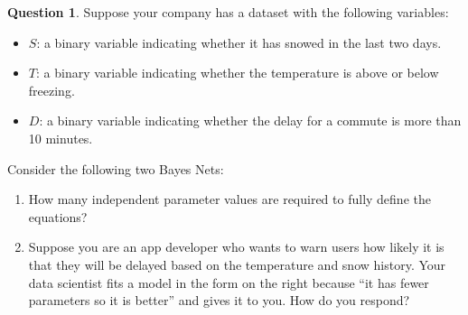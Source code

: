\documentclass{article}
\theoremstyle{definition}
\newtheorem{question}[thm]{Question}
\begin{document}
\begin{question}
Suppose your company has a dataset with the following variables:
\begin{itemize}[noitemsep]
    \item $S$: a binary variable indicating whether it has snowed in the last two days.
    \item $T$: a binary variable indicating whether the temperature is above or below freezing.
    \item $D$: a binary variable indicating whether the delay for a commute is more than 10 minutes.
\end{itemize}

Consider the following two Bayes Nets:

\begin{multicols}{2}
    \begin{center}

    \end{center}  
\end{multicols}

\begin{enumerate}[label=(\alph*)]
    \item How many independent parameter values are required to fully define the equations?
    \item Suppose you are an app developer who wants to warn users how likely it is that they will be delayed based on the temperature and snow history. Your data scientist fits a model in the form on the right because ``it has fewer parameters so it is better'' and gives it to you. How do you respond?
\end{enumerate}

\end{question}
\end{document}

